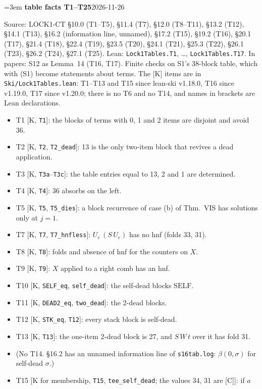 \documentclass[11pt]{amsart}
\makeatletter
\newcommand{\Self}{\mathrm{SELF}}
\newcounter{sense}
\newenvironment{entry}[3]{%
  \par\addvspace{\medskipamount}\noindent\phantomsection
  \def\@currentlabel{#2}\label{#1}\setcounter{sense}{0}\raggedright\emergencystretch=3em%
  \textbf{#2}\hfill{\footnotesize\textsf{#3}}\par\nopagebreak\noindent\ignorespaces}%
  {\par}
\newcommand{\src}[1]{\textsf{Source:} #1.\enskip}
\newcommand{\lean}[1]{\textsf{Lean:} #1.\enskip}
\newcommand{\appears}[1]{\textsf{In papers:} #1.\enskip}
\makeatother
\begin{document}
\begin{entry}{g:wl-table-facts}{table facts T1--T25}{2026-11-26}
\src{LOCK1-CT \S10.0 (T1--T5), \S11.4 (T7), \S12.0 (T8--T11), \S13.2 (T12), \S14.1 (T13), \S16.2
(information line, unnamed), \S17.2 (T15), \S19.2 (T16), \S20.1 (T17), \S21.4 (T18), \S22.4 (T19),
\S23.5 (T20), \S24.1 (T21), \S25.3 (T22), \S26.1 (T23), \S26.2 (T24), \S27.1 (T25)}
\lean{\texttt{Lock1Tables.T1}, \dots, \texttt{Lock1Tables.T17}}
\appears{S12 as Lemma~14 (T16, T17)}
Finite checks on S1's 38-block table, which with (S1) become statements about terms. The [K] items are
in \texttt{Ski/Lock1Tables.lean}: T1--T13 and T15 since lean-ski v1.18.0, T16 since v1.19.0, T17 since
v1.20.0; there is no T6 and no T14, and names in brackets are Lean declarations.
\begin{itemize}
\item T1 [K, \texttt{T1}]: the blocks of terms with 0, 1 and 2 items are disjoint and avoid 36.
\item T2 [K, \texttt{T2}, \texttt{T2\_dead}]: 13 is the only two-item block that revives a dead
application.
\item T3 [K, \texttt{T3a}--\texttt{T3c}]: the table entries equal to 13, 2 and 1 are determined.
\item T4 [K, \texttt{T4}]: 36 absorbs on the left.
\item T5 [K, \texttt{T5}, \texttt{T5\_dies}]: a block recurrence of case (b) of Thm.~VIS has solutions
only at $j=1$.
\item T7 [K, \texttt{T7}, \texttt{T7\_hnfless}]: $U_e\,(S\,U_e)$ has no hnf (folds 33, 31).
\item T8 [K, \texttt{T8}]: folds and absence of hnf for the counters on $X$.
\item T9 [K, \texttt{T9}]: $X$ applied to a right comb has an hnf.
\item T10 [K, \texttt{SELF\_eq}, \texttt{self\_dead}]: the self-dead blocks $\Self$.
\item T11 [K, \texttt{DEAD2\_eq}, \texttt{two\_dead}]: the 2-dead blocks.
\item T12 [K, \texttt{STK\_eq}, \texttt{T12}]: every stack block is self-dead.
\item T13 [K, \texttt{T13}]: the one-item 2-dead block is 27, and $S\,W\,t$ over it has fold 31.
\item (No T14. \S16.2 has an unnamed information line of \texttt{s16tab.log}: $\beta(0,\sigma)$ for
self-dead $\sigma$.)
\item T15 [K for membership, \texttt{T15}, \texttt{tee\_self\_dead}; the values 34, 31 are [C]]: if $a$

\end{itemize}
\end{entry}
\end{document}
